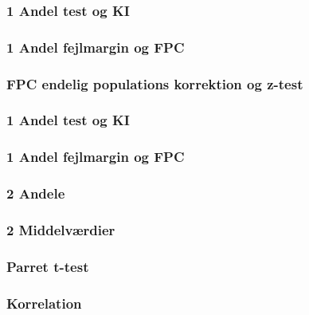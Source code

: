 \documentclass[]{book}
\begin{document}
\hypertarget{andel-test-og-ki}{%
\subsubsection{1 Andel test og KI}\label{andel-test-og-ki}}

\hypertarget{andel-fejlmargin-og-fpc}{%
\subsubsection{1 Andel fejlmargin og
FPC}\label{andel-fejlmargin-og-fpc}}

\hypertarget{fpc-endelig-populations-korrektion-og-z-test}{%
\subsubsection{FPC endelig populations korrektion og
z-test}\label{fpc-endelig-populations-korrektion-og-z-test}}

\hypertarget{andel-test-og-ki-1}{%
\subsubsection{1 Andel test og KI}\label{andel-test-og-ki-1}}

\hypertarget{andel-fejlmargin-og-fpc-1}{%
\subsubsection{1 Andel fejlmargin og
FPC}\label{andel-fejlmargin-og-fpc-1}}

\hypertarget{andele}{%
\subsubsection{2 Andele}\label{andele}}

\hypertarget{middelvrdier}{%
\subsubsection{2 Middelværdier}\label{middelvrdier}}

\hypertarget{parret-t-test}{%
\subsubsection{Parret t-test}\label{parret-t-test}}

\hypertarget{korrelation}{%
\subsubsection{Korrelation}\label{korrelation}}
\end{document}
